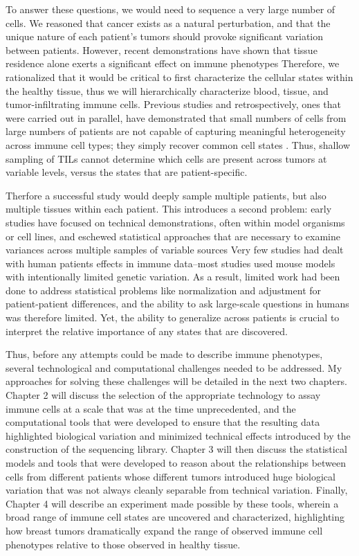 To answer these questions, we would need to sequence a very large number of cells. 
We reasoned that cancer exists as a natural perturbation, and that the unique nature of each patient’s tumors should provoke significant variation between patients. 
However, recent demonstrations have shown that tissue residence alone exerts a significant effect on immune phenotypes %
Therefore, we rationalized that it would be critical to first characterize the cellular states within the healthy tissue, thus we will hierarchically characterize blood, tissue, and tumor-infiltrating immune cells.
Previous studies and retrospectively, ones that were carried out in parallel, have demonstrated that small numbers of cells from large numbers of patients are not capable of capturing meaningful heterogeneity across immune cell types; they simply recover common cell states \citep{Chung2017}.
Thus, shallow sampling of TILs cannot determine which cells are present across tumors at variable levels, versus the states that are patient-specific. 

Therfore a successful study would deeply sample multiple patients, but also multiple tissues within each patient. 
This introduces a second problem: early studies have focused on technical demonstrations, often within model organisms or cell lines, and eschewed statistical approaches that are necessary to examine variances across multiple samples of variable sources
Very few studies had dealt with human patients effects in immune data--most studies used mouse models with intentionally limited genetic variation.
As a result, limited work had been done to address statistical problems like normalization and adjustment for patient-patient differences, and the ability to ask large-scale questions in humans was therefore limited. 
Yet, the ability to generalize across patients is crucial to interpret the relative importance of any states that are discovered.  

Thus, before any attempts could be made to describe immune phenotypes, several technological and computational challenges needed to be addressed. 
My approaches for solving these challenges will be detailed in the next two chapters. 
Chapter 2 will discuss the selection of the appropriate technology to assay immune cells at a scale that was at the time unprecedented, and the computational tools that were developed to ensure that the resulting data highlighted biological variation and minimized technical effects introduced by the construction of the sequencing library. 
Chapter 3 will then discuss the statistical models and tools that were developed to reason about the relationships between cells from different patients whose different tumors introduced huge biological variation that was not always cleanly separable from technical variation. 
Finally, Chapter 4 will describe an experiment made possible by these tools, wherein a broad range of immune cell states are uncovered and characterized, highlighting how breast tumors dramatically expand the range of observed immune cell phenotypes relative to those observed in healthy tissue. 

